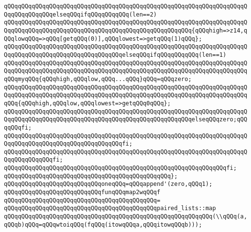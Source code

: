 \newline
\verb|qQQqqQQqqQQqqQQqqQQqqQQqqQQqqQQqqQQqqQQqqQQqqQQqqQQqqQQqqQQqqQQqqQQqqQQqqQQqqQQqqQQqelseqQQqifqQQqqQQqqQQq(len==2)|\newline
\verb|qQQqqQQqqQQqqQQqqQQqqQQqqQQqqQQqqQQqqQQqqQQqqQQqqQQqqQQqqQQqqQQqqQQqqQQqqQQqqQQqqQQqqQQqqQQqqQQqqQQqqQQqqQQqqQQqqQQqqQQqqQQq{qQQqhigh=>z14,qQQqlowqQQq=>qQQq[getqQQq(0)],qQQqlowest=>getqQQq(1)qQQq};|\newline
\verb|qQQqqQQqqQQqqQQqqQQqqQQqqQQqqQQqqQQqqQQqqQQqqQQqqQQqqQQqqQQqqQQqqQQqqQQqqQQqqQQqqQQqqQQqqQQqqQQqqQQqqQQqelseqQQqifqQQqqQQqqQQq(len==1)|\newline
\verb|qQQqqQQqqQQqqQQqqQQqqQQqqQQqqQQqqQQqqQQqqQQqqQQqqQQqqQQqqQQqqQQqqQQqqQQqqQQqqQQqqQQqqQQqqQQqqQQqqQQqqQQqqQQqqQQqqQQqqQQqqQQqqQQqqQQqqQQqqQQqqQQqmyqQQq{qQQqhigh,qQQqlow,qQQq...qQQq}qQQq=qQQqzero;|\newline
\verb|qQQqqQQqqQQqqQQqqQQqqQQqqQQqqQQqqQQqqQQqqQQqqQQqqQQqqQQqqQQqqQQqqQQqqQQqqQQqqQQqqQQqqQQqqQQqqQQqqQQqqQQqqQQqqQQqqQQqqQQqqQQqqQQqqQQqqQQqqQQqqQQq{qQQqhigh,qQQqlow,qQQqlowest=>getqQQq0qQQq};|\newline
\verb|qQQqqQQqqQQqqQQqqQQqqQQqqQQqqQQqqQQqqQQqqQQqqQQqqQQqqQQqqQQqqQQqqQQqqQQqqQQqqQQqqQQqqQQqqQQqqQQqqQQqqQQqqQQqqQQqqQQqqQQqqQQqelseqQQqzero;qQQqqQQqfi;|\newline
\verb|qQQqqQQqqQQqqQQqqQQqqQQqqQQqqQQqqQQqqQQqqQQqqQQqqQQqqQQqqQQqqQQqqQQqqQQqqQQqqQQqqQQqqQQqqQQqqQQqqQQqqQQqfi;|\newline
\verb|qQQqqQQqqQQqqQQqqQQqqQQqqQQqqQQqqQQqqQQqqQQqqQQqqQQqqQQqqQQqqQQqqQQqqQQqqQQqqQQqqQQqfi;|\newline
\verb|qQQqqQQqqQQqqQQqqQQqqQQqqQQqqQQqqQQqqQQqqQQqqQQqqQQqqQQqqQQqqQQqfi;|\newline
\newline
\verb|qQQqqQQqqQQqqQQqqQQqqQQqqQQqqQQqqQQqqQQqqQQqqQQq};|\newline
\newline
\verb|qQQqqQQqqQQqqQQqqQQqqQQqqQQqoneqQQq=qQQqappend'(zero,qQQq1);|\newline
\newline
\verb|qQQqqQQqqQQqqQQqqQQqqQQqqQQqfunqQQqmap2wqQQqf|\newline
\verb|qQQqqQQqqQQqqQQqqQQqqQQqqQQqqQQqqQQqqQQqqQQq=|\newline
\verb|qQQqqQQqqQQqqQQqqQQqqQQqqQQqqQQqqQQqqQQqqQQqpaired_lists::map|\newline
\verb|qQQqqQQqqQQqqQQqqQQqqQQqqQQqqQQqqQQqqQQqqQQqqQQqqQQqqQQqqQQq(\\qQQq(a,qQQqb)qQQq=qQQqwtoiqQQq(fqQQq(itowqQQqa,qQQqitowqQQqb)));|\newline
